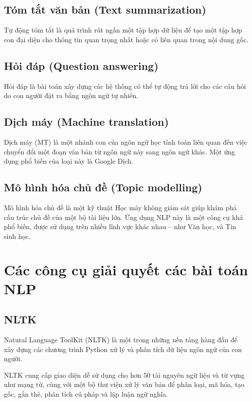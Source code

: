 \subsection{Tóm tắt văn bản (Text summarization)}
Tự động tóm tắt là quá trình rút ngắn một tập hợp dữ liệu để tạo một tập hợp con đại diện cho thông tin quan trọng nhất hoặc có liên quan trong nội dung gốc.\cite{WEBSITE:3}

\subsection{Hỏi đáp (Question answering)}
Hỏi đáp là bài toán xây dựng các hệ thống có thể tự động trả lời cho các câu hỏi do con người đặt ra bằng ngôn ngữ tự nhiên.\cite{WEBSITE:3}

\subsection{Dịch máy (Machine translation)}
Dịch máy (MT) là một nhánh con của ngôn ngữ học tính toán liên quan đến việc chuyển đổi một đoạn văn bản từ ngôn ngữ này sang ngôn ngữ khác. Một ứng dụng phổ biến của loại này là Google Dịch.\cite{WEBSITE:3}

\subsection{Mô hình hóa chủ đề (Topic modelling)}
Mô hình hóa chủ đề là một kỹ thuật Học máy không giám sát giúp khám phá cấu trúc chủ đề của một bộ tài liệu lớn. Ứng dụng NLP này là một công cụ khá phổ biến, được sử dụng trên nhiều lĩnh vực khác nhau – như Văn học, và Tin sinh học.\cite{WEBSITE:3}



\section{Các công cụ giải quyết các bài toán NLP} 
\subsection{NLTK}
Natural Language ToolKit (NLTK) là một trong những nền tảng hàng đầu để xây dựng các chương trình Python xử lý và phân tích dữ liệu ngôn ngữ của con người. 

NLTK cung cấp giao diện dễ sử dụng cho hơn 50 tài nguyên ngữ liệu và từ vựng như mạng từ, cùng với một bộ thư viện xử lý văn bản để phân loại, mã hóa, tạo gốc, gắn thẻ, phân tích cú pháp và lập luận ngữ nghĩa.\cite{WEBSITE:3}

